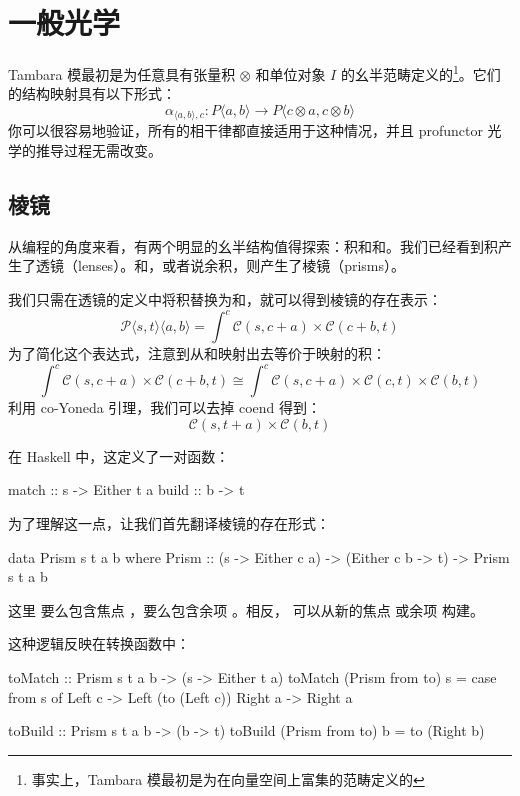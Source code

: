 \documentclass[DaoFP]{subfiles}
\begin{document}
\section{一般光学}
Tambara 模最初是为任意具有张量积 $\otimes$ 和单位对象 $I$ 的幺半范畴定义的\footnote{事实上，Tambara 模最初是为在向量空间上富集的范畴定义的}。它们的结构映射具有以下形式：
\[ \alpha_{\langle a, b\rangle, c} \colon P \langle a, b \rangle \to P \langle c \otimes a, c \otimes b \rangle \]
你可以很容易地验证，所有的相干律都直接适用于这种情况，并且 profunctor 光学的推导过程无需改变。

\subsection{棱镜}

从编程的角度来看，有两个明显的幺半结构值得探索：积和和。我们已经看到积产生了透镜（lenses）。和，或者说余积，则产生了棱镜（prisms）。

我们只需在透镜的定义中将积替换为和，就可以得到棱镜的存在表示：
\[ \mathcal{P}\langle s, t\rangle \langle a, b \rangle = \int^{c} \mathcal{C}(s, c + a) \times  \mathcal{C}(c + b, t) \]
为了简化这个表达式，注意到从和映射出去等价于映射的积：
\[ \int^{c} \mathcal{C}(s, c + a) \times  \mathcal{C}(c + b, t) \cong  \int^{c} \mathcal{C}(s, c + a) \times  \mathcal{C}(c, t) \times  \mathcal{C}(b, t) \]
利用 co-Yoneda 引理，我们可以去掉 coend 得到：
\[ \mathcal{C}(s, t + a) \times  \mathcal{C}(b, t) \]

在 Haskell 中，这定义了一对函数：
\begin{haskell}
match :: s -> Either t a
build :: b -> t
\end{haskell}

为了理解这一点，让我们首先翻译棱镜的存在形式：
\begin{haskell}
data Prism s t a b where
  Prism :: (s -> Either c a) -> (Either c b -> t) -> Prism s t a b
\end{haskell}
这里  要么包含焦点 ，要么包含余项 。相反， 可以从新的焦点  或余项  构建。

这种逻辑反映在转换函数中：
\begin{haskell}
toMatch :: Prism s t a b -> (s -> Either t a)
toMatch (Prism from to) s =
  case from s of
    Left  c -> Left (to (Left c))
    Right a -> Right a
\end{haskell}

\begin{haskell}
toBuild :: Prism s t a b -> (b -> t)
toBuild (Prism from to) b = to (Right b)
\end{haskell}
\end{document}
